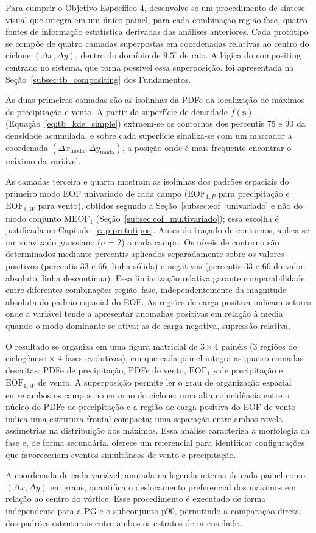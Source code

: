 Para cumprir o Objetivo Específico 4, desenvolve-se um procedimento de síntese visual que integra em um único painel, para cada combinação região-fase, quatro fontes de informação estatística derivadas das análises anteriores. Cada protótipo se compõe de quatro camadas superpostas em coordenadas relativas ao centro do ciclone $(\Delta x, \Delta y)$, dentro do domínio de $9.5^{\circ}$ de raio. A lógica do compositing centrado no sistema, que torna possível essa superposição, foi apresentada na Seção~\ref{subsec:tb_compositing} dos Fundamentos.

As duas primeiras camadas são as isolinhas da PDFe da localização de máximos de precipitação e vento. A partir da superfície de densidade $\hat{f}(\mathbf{s})$ (Equação~\ref{eq:tb_kde_simple}) extraem-se os contornos dos percentis 75 e 90 da densidade acumulada, e sobre cada superfície sinaliza-se com um marcador a coordenada $(\Delta x_{\text{moda}}, \Delta y_{\text{moda}})$, a posição onde é mais frequente encontrar o máximo da variável.

As camadas terceira e quarta mostram as isolinhas dos padrões espaciais do primeiro modo EOF univariado de cada campo ($\text{EOF}_{1,P}$ para precipitação e $\text{EOF}_{1,W}$ para vento), obtidos segundo a Seção~\ref{subsec:eof_univariado} e não do modo conjunto MEOF$_1$ (Seção~\ref{subsec:eof_multivariado}); essa escolha é justificada no Capítulo~\ref{cap:prototipos}.
Antes do traçado de contornos, aplica-se um suavizado gaussiano ($\sigma = 2$) a cada campo. Os níveis de contorno são determinados mediante percentis aplicados separadamente sobre os valores positivos (percentis 33 e 66, linha sólida) e negativos (percentis 33 e 66 do valor absoluto, linha descontínua).
Essa limiarização relativa garante comparabilidade entre diferentes combinações região--fase, independentemente da magnitude absoluta do padrão espacial do EOF.
As regiões de carga positiva indicam setores onde a variável tende a apresentar anomalias positivas em relação à média quando o modo dominante se ativa; as de carga negativa, supressão relativa.

O resultado se organiza em uma figura matricial de $3 \times 4$ painéis (3 regiões de ciclogênese $\times$ 4 fases evolutivas), em que cada painel integra as quatro camadas descritas: PDFe de precipitação, PDFe de vento, $\text{EOF}_{1,P}$ de precipitação e $\text{EOF}_{1,W}$ de vento.
A superposição permite ler o grau de organização espacial entre ambos os campos no entorno do ciclone: uma alta coincidência entre o núcleo do PDFe de precipitação e a região de carga positiva do EOF de vento indica uma estrutura frontal compacta; uma separação entre ambos revela assimetrias na distribuição dos máximos.
Essa análise caracteriza a morfologia da fase e, de forma secundária, oferece um referencial para identificar configurações que favoreceriam eventos simultâneos de vento e precipitação.

A coordenada de cada variável, anotada na legenda interna de cada painel como $(\Delta x, \Delta y)$ em graus, quantifica o deslocamento preferencial dos máximos em relação ao centro do vórtice.
Esse procedimento é executado de forma independente para a PG e o subconjunto p90, permitindo a comparação direta dos padrões estruturais entre ambos os estratos de intensidade.
